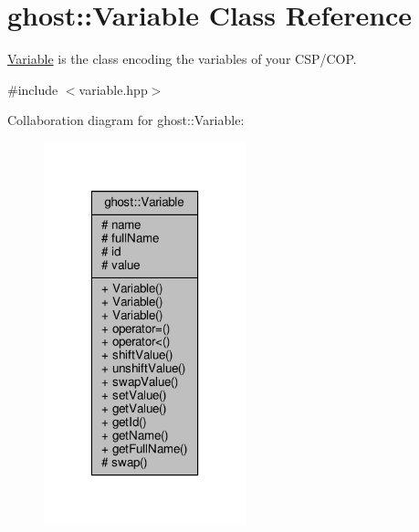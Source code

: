 \hypertarget{classghost_1_1Variable}{\section{ghost\-:\-:Variable Class Reference}
\label{classghost_1_1Variable}
}


\hyperlink{classghost_1_1Variable}{Variable} is the class encoding the variables of your C\-S\-P/\-C\-O\-P.  




{\ttfamily \#include $<$variable.\-hpp$>$}



Collaboration diagram for ghost\-:\-:Variable\-:
\nopagebreak
\begin{figure}[H]
\begin{center}
\leavevmode
\includegraphics[width=166pt]{classghost_1_1Variable__coll__graph}
\end{center}
\end{figure}
